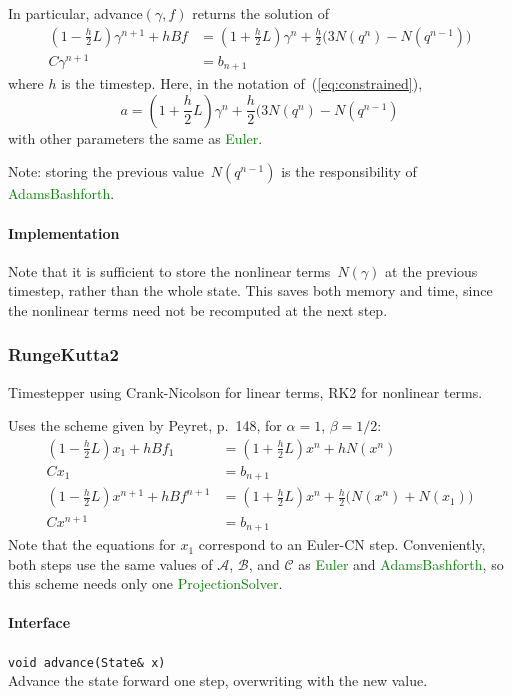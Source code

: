 \documentclass[11pt]{article}
\def\class#1{\textcolor{green}{\ttfamily\small #1}} %
\def\fn#1{{\ttfamily\small #1}} %
\let\code\lstinline
\begin{document}
In particular, \fn{advance}$(\gamma,f)$ returns the solution of
	\begin{align}
		(1-\frac{h}{2}L)\gamma^{n+1} + hBf &= (1 + \frac{h}{2}L)\gamma^n + \frac{h}{2} \big(3N(q^n) - N(q^{n-1})\big)\\
		C\gamma^{n+1} &= b_{n+1}
	\end{align}
where $h$ is the timestep.  Here, in the notation of~(\ref{eq:constrained}),
\begin{equation}
	a = (1+\frac{h}{2}L)\gamma^n + \frac{h}{2}(3N(q^n) - N(q^{n-1})
\end{equation}
with other parameters the same as \class{Euler}.

Note: storing the previous value~$N(q^{n-1})$ is the responsibility of \class{AdamsBashforth}.

\paragraph{Implementation}
Note that it is sufficient to store the nonlinear terms~$N(\gamma)$ at the previous timestep, rather than the whole state. This saves both memory and time, since the nonlinear terms need not be recomputed at the next step.

\subsubsection{RungeKutta2}
Timestepper using Crank-Nicolson for linear terms, RK2 for nonlinear terms.

Uses the scheme given by Peyret, p.~148\cite{Peyret:2002}, for $\alpha=1$, $\beta=1/2$:
\begin{align}
	(1 - \frac{h}{2}L)x_1 + hBf_1 &= (1+\frac{h}{2}L)x^n + hN(x^n)\\
	Cx_1 &= b_{n+1}\\
	(1-\frac{h}{2}L)x^{n+1} + hBf^{n+1} &= (1 + \frac{h}{2}L)x^n + \frac{h}{2}\big(N(x^n) + N(x_1)\big)\\
	Cx^{n+1} &= b_{n+1}
\end{align}
Note that the equations for $x_1$ correspond to an Euler-CN step.  Conveniently, both steps use the same values of $\mathcal{A}$, $\mathcal{B}$, and $\mathcal{C}$ as \class{Euler} and \class{AdamsBashforth}, so this scheme needs only one \class{ProjectionSolver}.

\paragraph{Interface}
\begin{description}
	\item \code|void advance(State& x)|\\
		Advance the state forward one step, overwriting with the new value.
\end{description}
		
\end{document}
